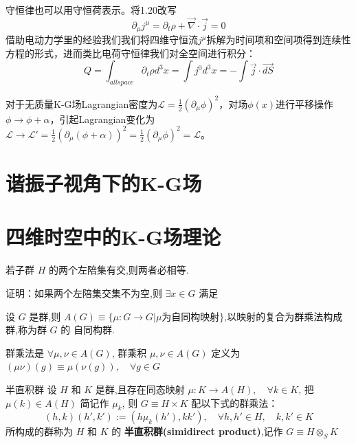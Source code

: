 \documentclass[../main.tex]{subfiles}
\begin{document}
    守恒律也可以用守恒荷表示。将1.20改写
    \begin{equation}
        \partial_{\mu} j^{\mu} = \partial_t \rho +\overrightarrow{\nabla} \cdot \overrightarrow{j} = 0 
    \end{equation}
    借助电动力学里的经验我们我们将四维守恒流$j^{\mu}$拆解为时间项和空间项得到连续性方程的形式，进而类比电荷守恒律我们对全空间进行积分：
    \begin{equation}
        Q = \int_{all space} \partial_t \rho d^3x = \int j^0 d^3x = - \int \overrightarrow{j} \cdot \overrightarrow{dS}
    \end{equation}
\begin{example}
    对于无质量K-G场Lagrangian密度为$\mathcal{L} = \frac{1}{2}(\partial_{\mu}\phi)^2 $，对场$\phi(x)$进行平移操作$\phi\rightarrow\phi+\alpha$，引起Lagrangian变化为
    $\mathcal{L}\rightarrow\mathcal{L}' = \frac{1}{2}\left( \partial_{\mu}(\phi + \alpha) \right)^2 = \frac{1}{2}(\partial_{\mu}\phi)^2 =\mathcal{L}$。
\end{example}
\section{谐振子视角下的K-G场}

\section{四维时空中的K-G场理论}


\begin{note}
    若子群 $H$ 的两个左陪集有交,则两者必相等.
\end{note}
    \noindent
    证明：如果两个左陪集交集不为空,则 $\exists x \in G$ 满足

\begin{definition}
    设 $G$ 是群,则 $A(G)\equiv \{\mu:G\rightarrow G|\mu\text{为自同构映射}\}$,以映射的复合为群乘法构成群,称为群 $G$ 的 自同构群.

    群乘法是 $\forall \mu,\nu \in A(G)$, 群乘积 $\mu,\nu \in A(G)$ 定义为 $(\mu\nu)(g) \equiv \mu(\nu(g)),\quad \forall g \in G$
\end{definition}

\begin{definition}{}{半直积群}
设 $H$ 和 $K$ 是群,且存在同态映射 $\mu:K\rightarrow A(H),\quad \forall k \in K$, 把 $\mu(k)\in A(H)$ 简记作 $\mu_k$, 则 $G\equiv H\times K$ 配以下式的群乘法：
    $$
    (h, k)(h', k'):=(h\mu_k(h'), kk'),\quad\forall h, h'\in H,\quad k, k' \in K
    $$
所构成的群称为 $H$ 和 $K$ 的 \textbf{半直积群(simidirect product)},记作 $G\equiv H\otimes_{S}K$
\end{definition}
\end{document}
